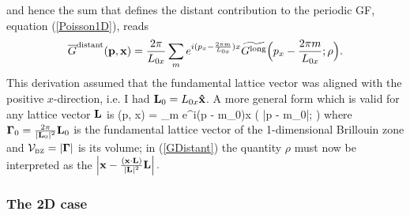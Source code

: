\documentclass[letterpaper]{article}
\newcommand{\wt}{\widetilde}
\newcommand{\vbGamma}{\boldsymbol{\Gamma}}
\begin{document}
and hence the sum that defines the distant contribution
to the periodic GF, equation (\ref{Poisson1D}), reads
$$\overline{G}\sups{distant}(\vb p, \vb x) 
  =\frac{2\pi}{L_{0x}} \sum_{m} e^{i(p_x - \frac{2\pi m}{L_{0x}})x}
   \wt{G\sups{long}}\Big( p_x - \frac{2\pi m}{L_{0x}}; \rho\Big).
$$
This derivation assumed that the fundamental lattice vector was aligned 
with the positive $x$-direction, i.e. I had $\mathbf{L}_0=L_{0x}\mathbf{\hat x}$.
A more general form which is valid for any lattice vector $\mathbf{L}$
is 
{
  (\vb p, \vb x)
  =
   \sum_{m} e^{i(\vb p - m\vbGamma_0)\cdot \vb x}
          \wt{G\sups{long}}\Big( \big|\vb p - m\vbGamma_0\big|; \rho\Big)
}
where $\vbGamma_0=\frac{2\pi}{|\vb L_0|^2}\vb L_0$ 
is the fundamental lattice vector of the 1-dimensional
Brillouin zone and 
$\mc V\subt{BZ}=|\vbGamma|$ is its volume; in (\ref{GDistant}) 
the quantity $\rho$ must now be interpreted as the 
$\left| \mathbf{x} - \frac{(\mathbf{x} \cdot \mathbf{L})}{|\mathbf{L}|^2}\mathbf{L}\right|.$

\subsubsection{The 2D case}
\end{document}
